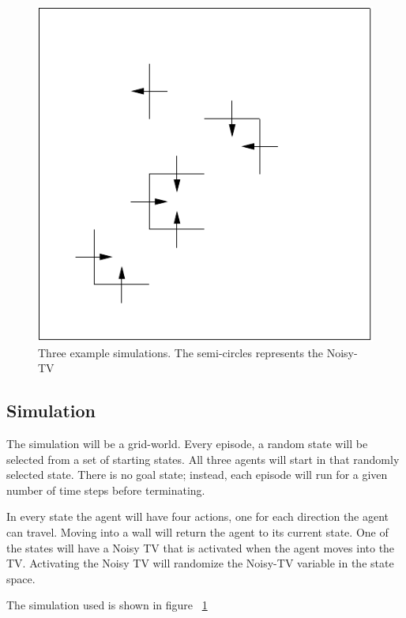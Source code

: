 \documentclass[12pt]{thesis}
\begin{document}
\begin{figure}
\begin{center}
	\includegraphics[scale=0.75]{"images/No-TV.pdf"}
	\end{center}
	\caption{Three example simulations. The semi-circles represents the Noisy-TV}
	\label{Fig:Sim}
\end{figure}
\subsection{Simulation}
The simulation will be a grid-world. Every episode, a random state will be selected from a set of starting states. All three agents will start in that randomly selected state. There is no goal state; instead, each episode will run for a given number of time steps before terminating.

In every state the agent will have four actions, one for each direction the agent can travel. Moving into a wall will return the agent to its current state. One of the states will have a Noisy TV that is activated when the agent moves into the TV. Activating the Noisy TV will randomize the Noisy-TV variable in the state space.

The simulation used is shown in figure 
\figurename~\ref{Fig:Sim}

\end{document}
